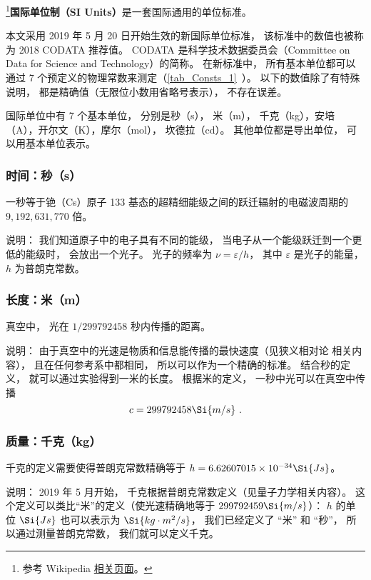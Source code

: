 

\footnote{参考 Wikipedia \href{https://en.wikipedia.org/wiki/International_System_of_Units}{相关页面}。}\textbf{国际单位制（SI Units）}是一套国际通用的单位标准。

本文采用 2019 年 5 月 20 日开始生效的新国际单位标准， 该标准中的数值也被称为 2018 CODATA 推荐值。 CODATA 是科学技术数据委员会（Committee on Data for Science and Technology）的简称。 在新标准中， 所有基本单位都可以通过 7 个预定义的物理常数来测定（\autoref{tab_Consts_1}~）。 以下的数值除了有特殊说明， 都是精确值（无限位小数用省略号表示）， 不存在误差。

国际单位中有 7 个基本单位， 分别是秒（s）， 米（m）， 千克（kg），安培（A），开尔文（K），摩尔（mol）， 坎德拉（cd）。 其他单位都是导出单位， 可以用基本单位表示。

\subsubsection{时间：秒（s）}
一秒等于铯（Cs）原子 133 基态的超精细能级之间的跃迁辐射的电磁波周期的 $9,192,631,770$ 倍。 

说明： 我们知道原子中的电子具有不同的能级， 当电子从一个能级跃迁到一个更低的能级时， 会放出一个光子。 光子的频率为 $\nu  = \varepsilon /h$，   其中 $\varepsilon $ 是光子的能量， $h$ 为普朗克常数。

\subsubsection{长度：米（m）}
真空中， 光在 $1/299792458$ 秒内传播的距离。

说明： 由于真空中的光速是物质和信息能传播的最快速度（见狭义相对论 相关内容）， 且在任何参考系中都相同， 所以可以作为一个精确的标准。 结合秒的定义， 就可以通过实验得到一米的长度。 根据米的定义， 一秒中光可以在真空中传播
\begin{equation}
c = 299792458 \Si{m/s}~.
\end{equation}

\subsubsection{质量：千克（kg）}
千克的定义需要使得普朗克常数精确等于 $h = 6.62607015\times10^{-34}\Si{Js}$。

说明： 2019 年 5 月开始， 千克根据普朗克常数定义（见量子力学相关内容）。 这个定义可以类比“米”的定义（使光速精确地等于 $299792459\Si{m/s}$）： $h$ 的单位 $\Si{Js}$ 也可以表示为 $\Si{kg\cdot m^2/s}$， 我们已经定义了 “米” 和 “秒”， 所以通过测量普朗克常数， 我们就可以定义千克。

